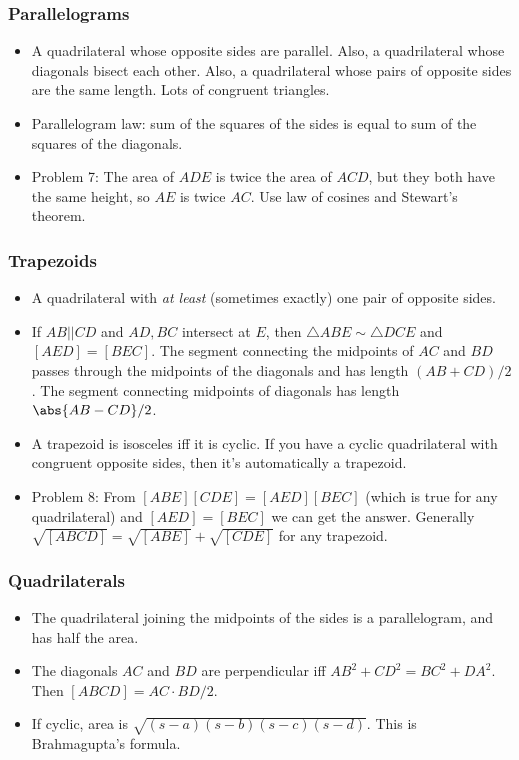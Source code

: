 \documentclass[10pt,paper=letter]{scrartcl}
\begin{document}
\subsubsection*{Parallelograms}

\begin{itemize}
  \item A quadrilateral whose opposite sides are parallel. Also, a quadrilateral whose diagonals bisect each other. Also, a quadrilateral whose pairs of opposite sides are the same length. Lots of congruent triangles. 
  \item Parallelogram law: sum of the squares of the sides is equal to sum of the squares of the diagonals.
  \item Problem 7: The area of $ADE$ is twice the area of $ACD$, but they both have the same height, so $AE$ is twice $AC$. Use law of cosines and Stewart's theorem.
\end{itemize}

\subsubsection*{Trapezoids}

\begin{itemize}
  \item A quadrilateral with \emph{at least} (sometimes exactly) one pair of opposite sides.
  \item If $AB||CD$ and $AD, BC$ intersect at $E$, then $\triangle ABE \sim \triangle DCE$ and $[AED] = [BEC]$. The segment connecting the midpoints of $AC$ and $BD$ passes through the midpoints of the diagonals and has length $(AB+CD)/2$. The segment connecting midpoints of diagonals has length $\abs{AB - CD}/2$.
  \item A trapezoid is isosceles iff it is cyclic. If you have a cyclic quadrilateral with congruent opposite sides, then it's automatically a trapezoid.
  \item Problem 8: From $[ABE][CDE] = [AED][BEC]$ (which is true for any quadrilateral) and $[AED] = [BEC]$ we can get the answer. Generally $\sqrt{[ABCD]} = \sqrt{[ABE]} + \sqrt{[CDE]}$ for any trapezoid.
\end{itemize}

\subsubsection*{Quadrilaterals}

\begin{itemize}
  \item The quadrilateral joining the midpoints of the sides is a parallelogram, and has half the area.
  \item The diagonals $AC$ and $BD$ are perpendicular iff $AB^2 + CD^2 = BC^2 + DA^2$. Then $[ABCD] = AC \cdot BD / 2$.
  \item If cyclic, area is $\sqrt{(s-a)(s-b)(s-c)(s-d)}$. This is Brahmagupta's formula.
\end{itemize}
\end{document}
